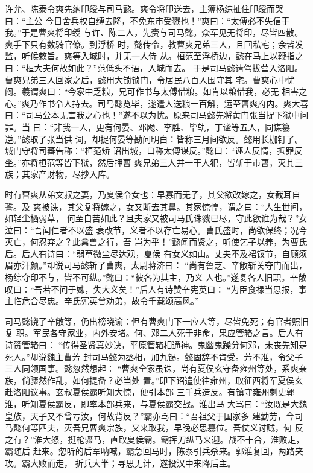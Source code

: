 许允、陈泰令爽先纳印绶与司马懿。爽令将印送去，主簿杨综扯住印绶而哭曰：“主公
今日舍兵权自缚去降，不免东市受戮也！”爽曰：“太傅必不失信于我。”于是曹爽将印绶
与许、陈二人，先赍与司马懿。众军见无将印，尽皆四散。爽手下只有数骑官僚。到浮桥
时，懿传令，教曹爽兄弟三人，且回私宅；余皆发监，听候敕旨。爽等入城时，并无一人侍
从。桓范至浮桥边，懿在马上以鞭指之曰：“桓大夫何故如此？”范低头不语，入城而去。
于是司马懿请驾拔营入洛阳。曹爽兄弟三人回家之后，懿用大锁锁门，令居民八百人围守其
宅。曹爽心中忧闷。羲谓爽曰：“今家中乏粮，兄可作书与太傅借粮。如肯以粮借我，必无
相害之心。”爽乃作书令人持去。司马懿览毕，遂遣人送粮一百斛，运至曹爽府内。爽大喜
曰：“司马公本无害我之心也！”遂不以为忧。原来司马懿先将黄门张当捉下狱中问罪。当
曰：“非我一人，更有何晏、邓飏、李胜、毕轨，丁谧等五人，同谋篡逆。”懿取了张当供
词，却捉何晏等勘问明白：皆称三月间欲反。懿用长枷钉了。城门守将司蕃告称：“桓范矫
诏出城，口称太傅谋反。”懿曰：“诬人反情，抵罪反坐。”亦将桓范等皆下狱，然后押曹
爽兄弟三人并一干人犯，皆斩于市曹，灭其三族；其家产财物，尽抄入库。

时有曹爽从弟文叔之妻，乃夏侯令女也：早寡而无子，其父欲改嫁之，女截耳自誓。及
爽被诛，其父复将嫁之，女又断去其鼻。其家惊惶，谓之曰：“人生世间，如轻尘栖弱草，
何至自苦如此？且夫家又被司马氏诛戮已尽，守此欲谁为哉？”女泣曰：“吾闻仁者不以盛
衰改节，义者不以存亡易心。曹氏盛时，尚欲保终；况今灭亡，何忍弃之？此禽兽之行，吾
岂为乎！”懿闻而贤之，听使乞子以养，为曹氏后。后人有诗曰：“弱草微尘尽达观，夏侯
有女义如山。丈夫不及裙钗节，自顾须眉亦汗颜。”却说司马懿斩了曹爽，太尉蒋济曰：
“尚有鲁芝、辛敞斩关夺门而出，杨综夺印不与，皆不可纵。”懿曰：“彼各为其主，乃义
人也。”遂复各人旧职。辛敞叹曰：“吾若不问于姊，失大义矣！”后人有诗赞辛宪英曰：
“为臣食禄当思报，事主临危合尽忠。辛氏宪英曾劝弟，故令千载颂高风。”

司马懿饶了辛敞等，仍出榜晓谕：但有曹爽门下一应人等，尽皆免死；有官者照旧复
职。军民各守家业，内外安堵。何、邓二人死于非命，果应管辂之言。后人有诗赞管辂曰：
“传得圣贤真妙诀，平原管辂相通神。鬼幽鬼躁分何邓，未丧先知是死人。”却说魏主曹芳
封司马懿为丞相，加九锡。懿固辞不肯受。芳不准，令父子三人同领国事。懿忽然想起：
“曹爽全家虽诛，尚有夏侯玄守备雍州等处，系爽亲族，倘骤然作乱，如何提备？必当处
置。”即下诏遣使往雍州，取征西将军夏侯玄赴洛阳议事。玄叔夏侯霸听知大惊，便引本部
三千兵造反。有镇守雍州刺史郭淮，听知夏侯霸反，即率本部兵来，与夏侯霸交战。淮出马
大骂曰：“汝既是大魏皇族，天子又不曾亏汝，何故背反？”霸亦骂曰：“吾祖父于国家多
建勤劳，今司马懿何等匹夫，灭吾兄曹爽宗族，又来取我，早晚必思篡位。吾仗义讨贼，何
反之有？”淮大怒，挺枪骤马，直取夏侯霸。霸挥刀纵马来迎。战不十合，淮败走，霸随后
赶来。忽听的后军呐喊，霸急回马时，陈泰引兵杀来。郭淮复回，两路夹攻。霸大败而走，
折兵大半；寻思无计，遂投汉中来降后主。

